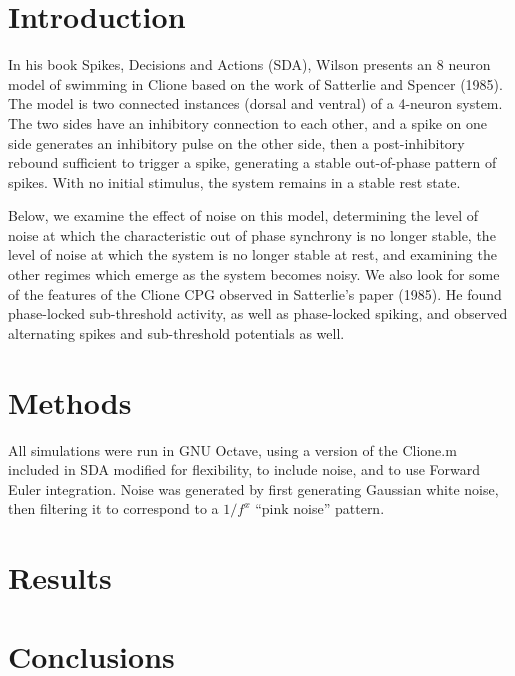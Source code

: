 \documentclass{article}
\title{\cTitle}
\author{\cAuthor}
\begin{document}
\maketitle

\section*{Introduction}
In his book Spikes, Decisions and Actions (SDA), Wilson presents an 8 neuron
model of swimming in Clione based on the work of Satterlie and Spencer (1985).
The model is two connected instances (dorsal and ventral) of a 4-neuron system.
The two sides have an inhibitory connection to each other, and a spike on one side
generates an inhibitory pulse on the other side, then a post-inhibitory rebound
sufficient to trigger a spike, generating a stable out-of-phase pattern of spikes.
With no initial stimulus, the system remains in a stable rest state.

\scalebox{0.6}{}
\scalebox{0.6}{}

Below, we examine the effect of noise on this model, determining the 
level of noise at which the characteristic out of phase synchrony is no longer stable,
the level of noise at which the system is no longer stable at rest,
and examining the other regimes which emerge as the system becomes noisy.
We also look for some of the features of the Clione CPG observed in Satterlie's paper (1985).
He found phase-locked sub-threshold activity, as well as phase-locked spiking, and observed
alternating spikes and sub-threshold potentials as well.

\section*{Methods}
All simulations were run in GNU Octave, using a version of the Clione.m included
in SDA modified for flexibility, to include noise, and to use Forward Euler integration.
Noise was generated by first generating Gaussian white noise, then filtering it to 
correspond to a $1/f^x$ ``pink noise'' pattern.

\section*{Results}
\section*{Conclusions}
\end{document}
